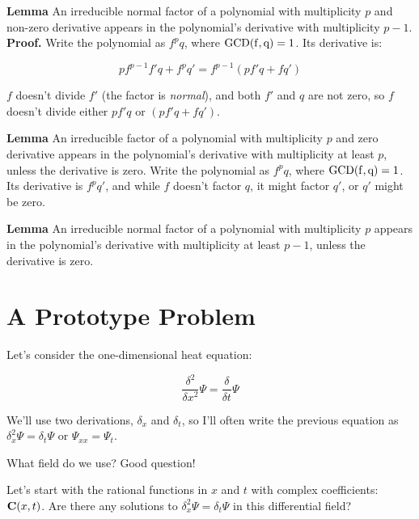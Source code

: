 \documentclass{article}
\newcommand{\GCD}{\ensuremath{\rm{GCD}}}
\begin{document}
{\bf Lemma} An irreducible normal factor of a polynomial with multiplicity
$p$ and non-zero derivative appears in the polynomial's derivative
with multiplicity $p-1$.  {\bf Proof.}  Write the polynomial as $f^p q$, where
$\GCD(f,q)=1$.  Its derivative is:

$$p f^{p-1} f' q + f^p q' = f^{p-1}(pf'q + fq')$$

$f$ doesn't divide $f'$ (the factor is {\it normal}), and both $f'$
and $q$ are not zero, so $f$ doesn't divide either $pf'q$ or
$(pf'q+fq')$.

{\bf Lemma} An irreducible factor of a polynomial with multiplicity
$p$ and zero derivative appears in the polynomial's derivative with
multiplicity at least $p$, unless the derivative is zero.  Write the
polynomial as $f^p q$, where $\GCD(f,q)=1$.  Its derivative is $f^p
q'$, and while $f$ doesn't factor $q$, it might factor $q'$, or
$q'$ might be zero.

{\bf Lemma} An irreducible normal factor of a polynomial with multiplicity
$p$ appears in the polynomial's derivative with multiplicity at least
$p-1$, unless the derivative is zero.

\vfill\eject
\section*{A Prototype Problem}

Let's consider the one-dimensional heat equation:

$$\frac{\delta^2}{\delta x^2} \Psi = \frac{\delta}{\delta t} \Psi$$

We'll use two derivations, $\delta_x$ and $\delta_t$, so I'll often
write the previous equation as $\delta_x^2 \Psi = \delta_t \Psi$
or $\Psi_{xx} = \Psi_{t}$.

What field do we use?  Good question!

Let's start with the rational functions in $x$ and $t$ with
complex coefficients: ${\bf C}(x,t)$.  Are there any solutions
to $\delta_x^2\Psi = \delta_t\Psi$ in this differential field?
\end{document}
